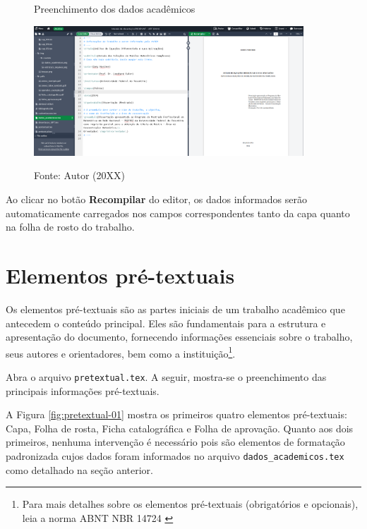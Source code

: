 \begin{apendicesenv}
\begin{figure}[H]
    \centering
    \caption{Preenchimento dos dados acadêmicos}
    \includegraphics[width=0.9\textwidth]{img/modelo/dados_academicos.png}
    \\
    \caption*{\small{Fonte: Autor (20XX)}}
    \label{fig:dados-academicos}
\end{figure}

Ao clicar no botão \textbf{Recompilar} do editor, os dados informados serão automaticamente carregados nos campos correspondentes tanto da capa quanto na folha de rosto do trabalho.

\section*{Elementos pré-textuais}

Os elementos pré-textuais são as partes iniciais de um trabalho acadêmico que antecedem o conteúdo principal. Eles são fundamentais para a estrutura e apresentação do documento, fornecendo informações essenciais sobre o trabalho, seus autores e orientadores, bem como a instituição\footnote{Para mais detalhes sobre os elementos pré-textuais (obrigatórios e opcionais), leia a norma ABNT NBR 14724 \cite{nbr14724}}.

Abra o arquivo \verb|pretextual.tex|. A seguir, mostra-se o preenchimento das principais informações pré-textuais.

A Figura \ref{fig:pretextual-01} mostra os primeiros quatro elementos pré-textuais: Capa, Folha de rosta, Ficha catalográfica e Folha de aprovação. Quanto aos dois primeiros, nenhuma intervenção é necessário pois são elementos de formatação padronizada cujos dados foram informados no arquivo \verb|dados_academicos.tex| como detalhado na seção anterior.


\end{apendicesenv}
